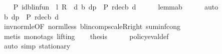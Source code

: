 \begin{isabellebody}
\ \ \isamarkupfalse%
\ {\isachardoublequoteopen}{\isacharquery}{\kern0pt}P\ {\isacharparenleft}{\kern0pt}{\isacharparenleft}{\kern0pt}id{\isacharunderscore}{\kern0pt}blinfun\ {\isacharminus}{\kern0pt}\ l\ {\isacharasterisk}{\kern0pt}\isactrlsub R\ {\isasymP}\ {\isacharquery}{\kern0pt}d{\isacharprime}{\kern0pt}{\isacharparenright}{\kern0pt}\ {\isacharparenleft}{\kern0pt}{\isasymnu}\isactrlsub b\ {\isacharquery}{\kern0pt}dp{\isacharparenright}{\kern0pt}{\isacharparenright}{\kern0pt}\ {\isasymle}\ {\isacharquery}{\kern0pt}P\ {\isacharparenleft}{\kern0pt}r{\isacharunderscore}{\kern0pt}dec\isactrlsub b\ {\isacharquery}{\kern0pt}d{\isacharprime}{\kern0pt}{\isacharparenright}{\kern0pt}{\isachardoublequoteclose}\isanewline
\ \ \ \ \isamarkupfalse%
\ lemma{\isacharunderscore}{\kern0pt}{}{\isacharunderscore}{\kern0pt}{}{\isacharunderscore}{\kern0pt}{}{\isacharunderscore}{\kern0pt}b\isanewline
\ \ \ \ \isamarkupfalse%
\ auto\isanewline
\ \ \isamarkupfalse%
\ {\isachardoublequoteopen}{\isasymnu}\isactrlsub b\ {\isacharquery}{\kern0pt}dp\ {\isasymle}\ {\isacharquery}{\kern0pt}P\ {\isacharparenleft}{\kern0pt}r{\isacharunderscore}{\kern0pt}dec\isactrlsub b\ {\isacharquery}{\kern0pt}d{\isacharprime}{\kern0pt}{\isacharparenright}{\kern0pt}{\isachardoublequoteclose}\isanewline
\ \ \ \ \isamarkupfalse%
\ inv{\isacharunderscore}{\kern0pt}norm{\isacharunderscore}{\kern0pt}le{\isacharprime}{\kern0pt}{\isacharparenleft}{\kern0pt}{}{\isacharparenright}{\kern0pt}{\isacharbrackleft}{\kern0pt}OF\ norm{\isacharunderscore}{\kern0pt}{\isasymP}l{\isacharunderscore}{\kern0pt}less{\isacharbrackright}{\kern0pt}\ blincomp{\isacharunderscore}{\kern0pt}scaleR{\isacharunderscore}{\kern0pt}right\ suminf{\isacharunderscore}{\kern0pt}cong\isanewline
\ \ \ \ \isamarkupfalse%
\ {\isacharparenleft}{\kern0pt}metis\ {\isacharparenleft}{\kern0pt}mono{\isacharunderscore}{\kern0pt}tags{\isacharcomma}{\kern0pt}\ lifting{\isacharparenright}{\kern0pt}{\isacharparenright}{\kern0pt}\isanewline
\ \ \isamarkupfalse%
\ {\isacharquery}{\kern0pt}thesis\isanewline
\ \ \ \ \isamarkupfalse%
\ policy{\isacharunderscore}{\kern0pt}eval{\isacharunderscore}{\kern0pt}def\isanewline
\ \ \ \ \isamarkupfalse%
\ {\isacharparenleft}{\kern0pt}auto\ simp{\isacharcolon}{\kern0pt}\ {\isasymnu}{\isacharunderscore}{\kern0pt}stationary{\isacharparenright}{\kern0pt}\isanewline

\end{isabellebody}
